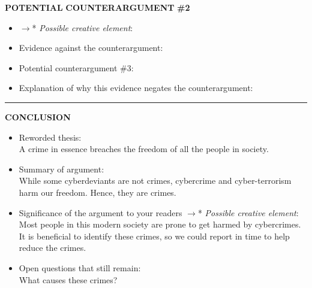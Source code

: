 \documentclass{article}
\begin{document}
\begin{paracol}{3}
	\switchcolumn[0]
	\noindent \textbf{POTENTIAL}
	\noindent \textbf{COUNTERARGUMENT}
	\noindent \textbf{\#2}
	\switchcolumn[2]
\begin{itemize}
	\item $\to$* \textit{Possible creative element}:\\
	\item Evidence against the counterargument:\\
	\item Potential counterargument \#3:\\
	\item Explanation of why this evidence negates the counterargument:
\end{itemize}
\end{paracol}
\noindent\rule{16cm}{0.4pt}

\begin{paracol}{3}
	\switchcolumn[0]
	\noindent \textbf{CONCLUSION}
	\switchcolumn[2]
\begin{itemize}
	\item Reworded thesis:\\
	A crime in essence breaches the freedom of all the people in society.
	\item Summary of argument:\\
		While some cyberdeviants are not crimes, cybercrime and cyber-terrorism harm our freedom. Hence, they are crimes.
	\item Significance of the argument to your readers $\to$* \textit{Possible creative element}:\\
	Most people in this modern society are prone to get harmed by cybercrimes. It is beneficial to identify these crimes, so we could report in time to help reduce the crimes.
	\item Open questions that still remain:\\
	What causes these crimes?
\end{itemize}
\end{paracol}
\end{document}
